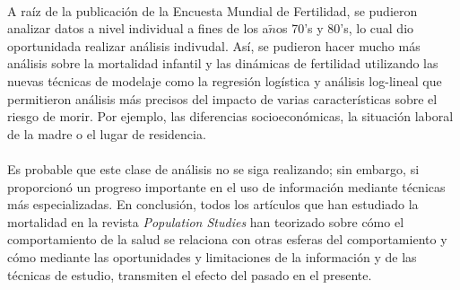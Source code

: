 \documentclass[10pt,spanish,letterpaper]{article}
\theoremstyle{plain}
\begin{document}
\\
A ra\'iz de la publicaci\'on de la Encuesta Mundial de Fertilidad, se pudieron analizar datos a nivel individual a fines de los a$\tilde{n}$os 70's y 80's, lo cual dio oportunidada realizar an\'alisis indivudal. As\'i, se pudieron hacer mucho m\'as an\'alisis sobre la mortalidad infantil y las din\'amicas de fertilidad utilizando las nuevas t\'ecnicas de modelaje como la regresi\'on log\'istica y an\'alisis log-lineal que permitieron an\'alisis m\'as precisos del impacto de varias caracter\'isticas sobre el riesgo de morir. Por ejemplo, las diferencias socioecon\'omicas, la situaci\'on laboral de la madre o el lugar de residencia.\\
\\
Es probable que este clase de an\'alisis no se siga realizando; sin embargo, si proporcion\'o un progreso importante en el uso de informaci\'on mediante t\'ecnicas m\'as especializadas. En conclusi\'on, todos los art\'iculos que han estudiado la mortalidad en la revista \textit{Population Studies} han teorizado sobre c\'omo el comportamiento de la salud se relaciona con otras esferas del comportamiento y c\'omo mediante las oportunidades y limitaciones de la informaci\'on y de las t\'ecnicas de estudio, transmiten el efecto del pasado en el presente.


\end{document}
